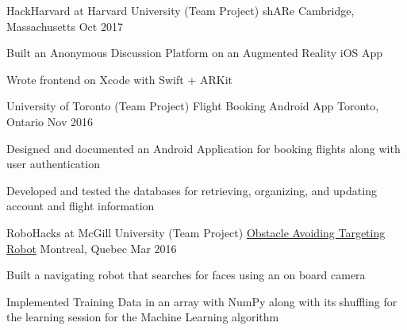 \begin{cventries}
\cventry
    {HackHarvard at Harvard University (Team Project)}
    {shARe}
    {Cambridge, Massachusetts}
    {Oct 2017}
    {
      \begin{cvitems}
        \item {Built an Anonymous Discussion Platform on an Augmented Reality iOS App}
        \item {Wrote frontend on Xcode with Swift + ARKit}
      \end{cvitems}
    }
\cventry
    {University of Toronto (Team Project)}
    {Flight Booking Android App}
    {Toronto, Ontario}
    {Nov 2016}
    {
      \begin{cvitems}
        \item {Designed and documented an Android Application for booking flights along with user authentication}
        \item {Developed and tested the databases for retrieving, organizing, and updating account and flight information}
      \end{cvitems}
    }
\cventry
    {RoboHacks at McGill University (Team Project)}
    {\href{https://github.com/PhABC/HeadHunterBots}{Obstacle Avoiding Targeting Robot}}
    {Montreal, Quebec}
    {Mar 2016}
    {
      \begin{cvitems}
        \item {Built a navigating robot that searches for faces using an on board camera}
        \item {Implemented Training Data in an array with NumPy along with its shuffling for the learning session for the Machine Learning algorithm}
      \end{cvitems}
    }
\end{cventries}